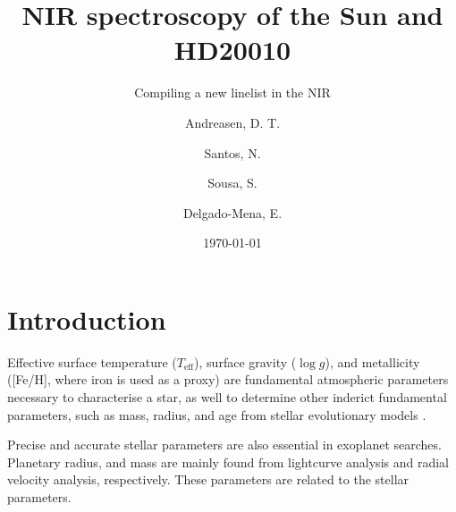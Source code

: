 \documentclass{aa}
\begin{document}
\title{NIR spectroscopy of the Sun and HD20010}
\subtitle{Compiling a new linelist in the NIR}

\subtitle{}

\author{Andreasen, D. T.\inst{\ref{inst1}, \ref{inst2}} \and
        Santos, N.\inst{\ref{inst1}} \and
        Sousa, S.\inst{\ref{inst1}} \and
        Delgado-Mena, E.\inst{\ref{inst1}}}



\date{\today}

\abstract{}{}{}{}



\maketitle



\section{Introduction}
\label{sec:introduction}
Effective surface temperature ($T_\mathrm{eff}$), surface gravity ($\log g$),
and metallicity ([Fe/H], where iron is used as a proxy) are fundamental
atmospheric parameters necessary to characterise a star, as well to determine
other inderict fundamental parameters, such as mass, radius, and age from
stellar evolutionary models \citep{Girardi2000}.

Precise and accurate stellar parameters are also essential in exoplanet
searches. Planetary radius, and mass are mainly found from lightcurve analysis and
radial velocity analysis, respectively. These parameters are related to the
stellar parameters.




%
\end{document}
